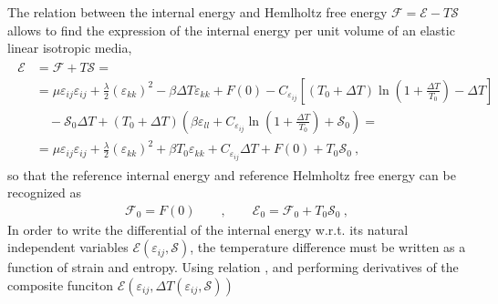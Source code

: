 \documentclass[letterpaper,10pt,english]{jupyterBook}
\begin{document}
\sphinxAtStartPar
{} The relation between the internal energy and Hemlholtz free energy \(\mathcal{F} = \mathcal{E} - T \mathcal{S}\) allows to find the expression of the internal energy per unit volume of an elastic linear isotropic media,
\begin{equation*}
\begin{split}\begin{aligned}
\mathcal{E} 
& = \mathcal{F} + T \mathcal{S} = \\
& = \mu \varepsilon_{ij} \varepsilon_{ij} + \frac{\lambda}{2} \left(  \varepsilon_{kk} \right)^2 - \beta \Delta T \varepsilon_{kk} + F(0) -C_{\varepsilon_{ij}} \left[ (T_0 + \Delta T) \ln \left( 1 + \frac{\Delta T}{T_0} \right) - \Delta T \right] \\
& \quad  - \mathcal{S}_0 \Delta T + (T_0 + \Delta T) \left( \beta \varepsilon_{ll} + C_{\varepsilon_{ij}} \ln \left( 1 + \frac{\Delta T}{T_0} \right) + \mathcal{S}_0 \right) = \\
& = \mu \varepsilon_{ij} \varepsilon_{ij} + \frac{\lambda}{2} \left(  \varepsilon_{kk} \right)^2 + \beta T_0 \varepsilon_{kk} + C_{\varepsilon_{ij}} \Delta T + F(0) + T_0 \mathcal{S}_0  \ ,
\end{aligned}\end{split}
\end{equation*}
\sphinxAtStartPar
so that the reference internal energy and reference Helmholtz free energy can be recognized as
\begin{equation*}
\begin{split}\mathcal{F}_0 = F(0) \qquad , \qquad \mathcal{E}_0 = \mathcal{F}_0 + T_0 \mathcal{S}_0 \ ,\end{split}
\end{equation*}
\sphinxAtStartPar
In order to write the differential of the internal energy w.r.t. its natural independent variables \(\mathcal{E}(\varepsilon_{ij}, \mathcal{S})\), the temperature difference must be written as a function of strain and entropy. Using relation , and performing derivatives of the composite funciton \(\mathcal{E}(\varepsilon_{ij}, \Delta T(\varepsilon_{ij}, \mathcal{S}))\)
\end{document}
